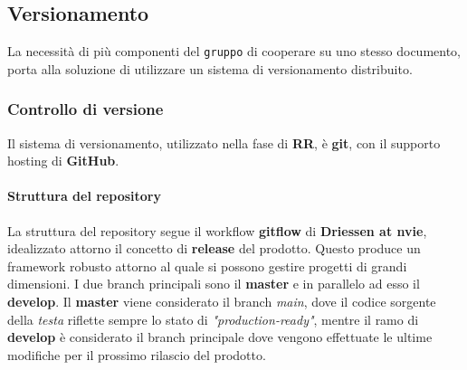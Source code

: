 \subsection{Versionamento}
La necessità di più componenti del \texttt{gruppo} di cooperare su uno stesso documento, porta alla soluzione di utilizzare un sistema di versionamento distribuito. 


\subsubsection{Controllo di versione}
Il sistema di versionamento, utilizzato nella fase di \textbf{RR}, è \textbf{git}, con il supporto hosting di \textbf{GitHub}.

	\paragraph{Struttura del repository} 
La struttura del repository segue il workflow \textbf{gitflow} di \textbf{Driessen at nvie}, idealizzato attorno il concetto di \textbf{release} del prodotto. Questo produce
un framework robusto attorno al quale si possono gestire progetti di grandi dimensioni. I due branch principali sono il \textbf{master} e in parallelo ad esso il \textbf{develop}. 
Il \textbf{master} viene considerato il branch \textit{main}, dove il codice sorgente della \textit{testa} riflette sempre lo stato di \textit{"production-ready"},
mentre il ramo di \textbf{develop} è considerato il branch principale dove vengono effettuate le ultime modifiche per il prossimo rilascio del prodotto. 


